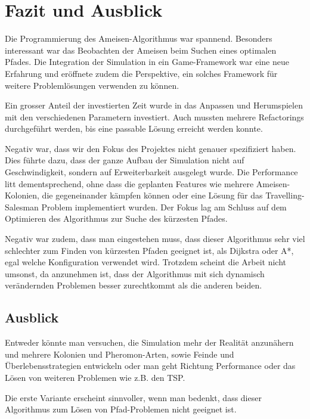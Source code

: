 
\chapter{Fazit und Ausblick}

Die Programmierung des Ameisen-Algorithmus war spannend. Besonders interessant war das Beobachten der Ameisen beim Suchen eines optimalen Pfades. Die Integration der Simulation in ein Game-Framework war eine neue Erfahrung und eröffnete zudem die Perspektive, ein solches Framework für weitere Problemlösungen verwenden zu können.

Ein grosser Anteil der investierten Zeit wurde in das Anpassen und Herumspielen mit den verschiedenen Parametern investiert. Auch mussten mehrere Refactorings durchgeführt werden, bis eine passable Lösung erreicht werden konnte.

Negativ war, dass wir den Fokus des Projektes nicht genauer spezifiziert haben. Dies führte dazu, dass der ganze Aufbau der Simulation nicht auf Geschwindigkeit, sondern auf Erweiterbarkeit ausgelegt wurde. Die Performance litt dementsprechend, ohne dass die geplanten Features wie mehrere Ameisen-Kolonien, die gegeneinander kämpfen können oder eine Lösung für das Travelling-Salesman Problem implementiert wurden. Der Fokus lag am Schluss auf dem Optimieren des Algorithmus zur Suche des kürzesten Pfades.

Negativ war zudem, dass man eingestehen muss, dass dieser Algorithmus sehr viel schlechter zum Finden von kürzesten Pfaden geeignet ist, als Dijkstra oder A*, egal welche Konfiguration verwendet wird. Trotzdem scheint die Arbeit nicht umsonst, da anzunehmen ist, dass der Algorithmus mit sich dynamisch verändernden Problemen besser zurechtkommt als die anderen beiden.

\section{Ausblick}

Entweder könnte man versuchen, die Simulation mehr der Realität anzunähern und mehrere Kolonien und Pheromon-Arten, sowie Feinde und Überlebensstrategien entwickeln oder man geht Richtung Performance oder das Lösen von weiteren Problemen wie z.B. den TSP.

Die erste Variante erscheint sinnvoller, wenn man bedenkt, dass dieser Algorithmus zum Lösen von Pfad-Problemen nicht geeignet ist.


